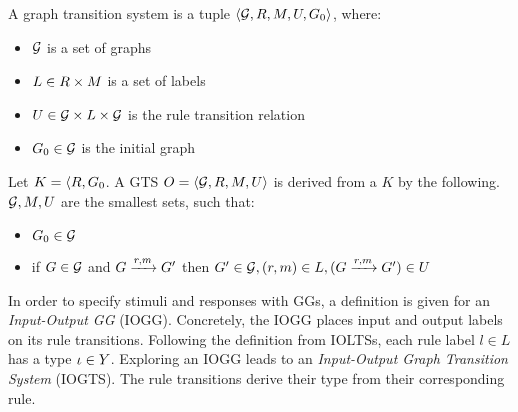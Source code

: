 \vspace{5px}
\begin{definition}
A graph transition system is a tuple	$\langle \mathcal{G}, R, M, U, G_0\rangle$, where:
\begin{itemize}
\item $\mathcal{G}$ is a set of graphs
\item $L \in R \times M$ is a set of labels
\item $U \in \mathcal{G} \times L \times \mathcal{G}$ is the rule transition relation
\item $G_0 \in \mathcal{G}$ is the initial graph
\end{itemize}
\end{definition}
\vspace{5px}

Let $K = \langle R, G_0$. A GTS $O = \langle \mathcal{G}, R, M, U\rangle$ is derived from a $K$ by the following. $\mathcal{G}, M, U$ are the smallest sets, such that:
\begin{itemize}
\item $G_0 \in \mathcal{G}$
\item if $G \in \mathcal{G}$ and $G \xrightarrow{r, m}G'$ then $G' \in \mathcal{G}, (r, m) \in L, (G \xrightarrow{r, m}G') \in U$
\end{itemize}

\vspace{5px}
\begin{definition}
In order to specify stimuli and responses with GGs, a definition is given for an \textit{Input-Output GG} (IOGG). Concretely, the IOGG places input and output labels on its rule transitions. Following the definition from IOLTSs, each rule label $l \in L$ has a type $\iota \in Y$. Exploring an IOGG leads to an \textit{Input-Output Graph Transition System} (IOGTS). The rule transitions derive their type from their corresponding rule.
\end{definition}
\vspace{5px}
